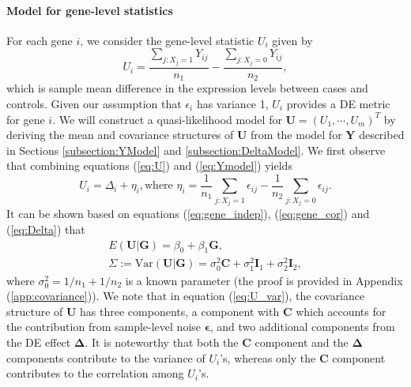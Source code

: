	\paragraph{Model for gene-level statistics}\label{subsection:UModel}
	For each gene $i$, we consider the gene-level statistic $U_i$ given by 
	\begin{equation}
	\label{eq:U}
	U_i = \dfrac{\sum_{j: X_j=1}Y_{ij}}{n_1} - \dfrac{\sum_{j: X_j=0}Y_{ij}}{n_2},
	\end{equation}
	which is sample mean difference in the expression levels between cases and controls. Given our
	assumption that $\epsilon_i$ has variance 1, $U_i$ provides a DE metric for gene $i$. We will
	construct a quasi-likelihood model for $\bm U=(U_1,\cdots,U_m)^T$ by deriving the mean and
	covariance structures of $\bm U$ from the model for $\bm Y$ described in Sections
	\ref{subsection:YModel} and \ref{subsection:DeltaModel}. We first observe that combining 
	equations (\ref{eq:U}) and (\ref{eq:Ymodel}) yields
	\begin{equation} 
	U_i = \Delta_i + \eta_i, \text{where } \eta_i = \dfrac{1}{n_1}\sum_{j: X_j=1}\epsilon_{ij}-
	\dfrac{1}{n_2}\sum_{j: X_j=0}\epsilon_{ij}.
	\end{equation}
	It can be shown based on equations (\ref{eq:gene_indep}), (\ref{eq:gene_cor}) and 
	(\ref{eq:Delta}) that
	\begin{gather}
	E(\bm U|\bm G) = \beta_0+\beta_1 \bm G,\label{eq:U_mean}\\
	\Sigma:=\mbox{Var}(\bm U|\bm G) = \sigma_0^2\bm C + \sigma_1^2\bm I_1+\sigma_2^2\bm
	I_2,\label{eq:U_var}
	\end{gather}
	where $\sigma_0^2=1/n_1+1/n_2$ is a known parameter (the proof is provided in Appendix 
	(\ref{app:covariance})). We note that in equation (\ref{eq:U_var}), the	covariance structure of 
	$\bm U$ has three components, a component with $\bm C$ which accounts for the contribution from 
	sample-level noise $\bm \epsilon$, and two additional components from the DE effect $\bm 
	\Delta$. It is noteworthy that both the $\bm C$ component and the $\bm \Delta$ components 
	contribute to the variance of $U_i$'s, whereas only the $\bm C$ component contributes to
	the correlation among $U_i$'s.
	

